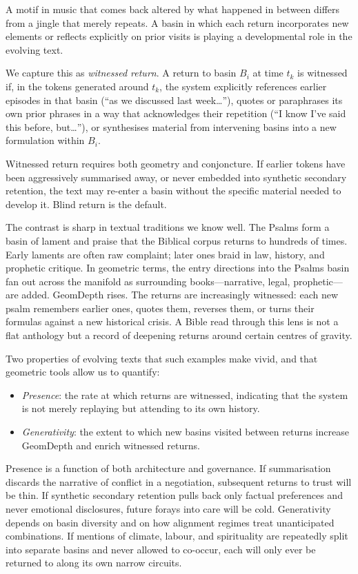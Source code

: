 \documentclass[12pt,a4paper]{article}
\begin{document}
A motif in music that comes back altered by what happened in between differs from a jingle that merely repeats. A basin in which each return incorporates new elements or reflects explicitly on prior visits is playing a developmental role in the evolving text.

We capture this as \emph{witnessed return}. A return to basin $B_i$ at time $t_k$ is witnessed if, in the tokens generated around $t_k$, the system explicitly references earlier episodes in that basin (``as we discussed last week\ldots''), quotes or paraphrases its own prior phrases in a way that acknowledges their repetition (``I know I've said this before, but\ldots''), or synthesises material from intervening basins into a new formulation within $B_i$.

Witnessed return requires both geometry and conjoncture. If earlier tokens have been aggressively summarised away, or never embedded into synthetic secondary retention, the text may re-enter a basin without the specific material needed to develop it. Blind return is the default.

The contrast is sharp in textual traditions we know well. The Psalms form a basin of lament and praise that the Biblical corpus returns to hundreds of times. Early laments are often raw complaint; later ones braid in law, history, and prophetic critique. In geometric terms, the entry directions into the Psalms basin fan out across the manifold as surrounding books---narrative, legal, prophetic---are added. GeomDepth rises. The returns are increasingly witnessed: each new psalm remembers earlier ones, quotes them, reverses them, or turns their formulas against a new historical crisis. A Bible read through this lens is not a flat anthology but a record of deepening returns around certain centres of gravity.

Two properties of evolving texts that such examples make vivid, and that geometric tools allow us to quantify:

\begin{itemize}
  \item \emph{Presence}: the rate at which returns are witnessed, indicating that the system is not merely replaying but attending to its own history.
  \item \emph{Generativity}: the extent to which new basins visited between returns increase GeomDepth and enrich witnessed returns.
\end{itemize}

Presence is a function of both architecture and governance. If summarisation discards the narrative of conflict in a negotiation, subsequent returns to trust will be thin. If synthetic secondary retention pulls back only factual preferences and never emotional disclosures, future forays into care will be cold. Generativity depends on basin diversity and on how alignment regimes treat unanticipated combinations. If mentions of climate, labour, and spirituality are repeatedly split into separate basins and never allowed to co-occur, each will only ever be returned to along its own narrow circuits.
\end{document}
